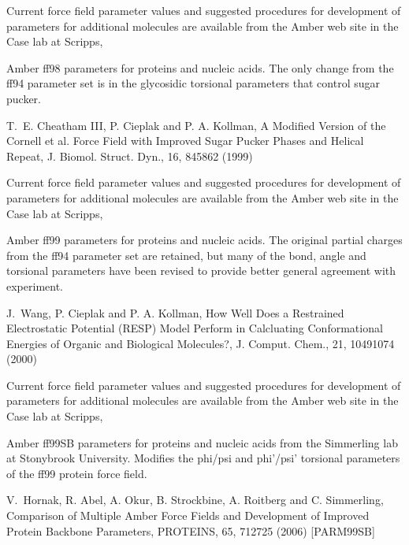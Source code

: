 \documentclass[letterpaper,11pt,english]{sphinxmanual}
\begin{document}
\sphinxAtStartPar
Current force field parameter values and suggested procedures for development of parameters for additional molecules are available from the Amber web site in the Case lab at Scripps, 

\sphinxAtStartPar
{}

\sphinxAtStartPar
Amber ff98 parameters for proteins and nucleic acids. The only change from the ff94 parameter set is in the glycosidic torsional parameters that control sugar pucker.

\sphinxAtStartPar
T. E. Cheatham III, P. Cieplak and P. A. Kollman, A Modified Version of the Cornell et al. Force Field with Improved Sugar Pucker Phases and Helical Repeat, J. Biomol. Struct. Dyn., 16, 845\sphinxhyphen{}862 (1999)

\sphinxAtStartPar
Current force field parameter values and suggested procedures for development of parameters for additional molecules are available from the Amber web site in the Case lab at Scripps, 

\sphinxAtStartPar
{}

\sphinxAtStartPar
Amber ff99 parameters for proteins and nucleic acids. The original partial charges from the ff94 parameter set are retained, but many of the bond, angle and torsional parameters have been revised to provide better general agreement with experiment.

\sphinxAtStartPar
J. Wang, P. Cieplak and P. A. Kollman, How Well Does a Restrained Electrostatic Potential (RESP) Model Perform in Calcluating Conformational Energies of Organic and Biological Molecules?, J. Comput. Chem., 21, 1049\sphinxhyphen{}1074 (2000)

\sphinxAtStartPar
Current force field parameter values and suggested procedures for development of parameters for additional molecules are available from the Amber web site in the Case lab at Scripps, 

\sphinxAtStartPar
{}

\sphinxAtStartPar
Amber ff99SB parameters for proteins and nucleic acids from the Simmerling lab at Stonybrook University. Modifies the phi/psi and phi’/psi’ torsional parameters of the ff99 protein force field.

\sphinxAtStartPar
V. Hornak, R. Abel, A. Okur, B. Strockbine, A. Roitberg and C. Simmerling, Comparison of Multiple Amber Force Fields and Development of Improved Protein Backbone Parameters, PROTEINS, 65, 712\sphinxhyphen{}725 (2006)  {[}PARM99SB{]}
\end{document}
